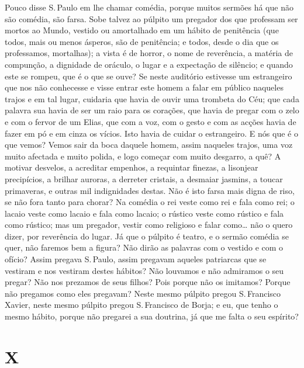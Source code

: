 Pouco disse S.\,Paulo em lhe chamar comédia, porque muitos sermões há
que não são comédia, são farsa. Sobe talvez ao púlpito um pregador dos
que professam ser mortos ao Mundo, vestido ou amortalhado em um hábito
de penitência (que todos, mais ou menos ásperos, são de penitência; e
todos, desde o dia que os professamos, mortalhas); a vista é de horror,
o nome de reverência, a matéria de compunção, a dignidade de oráculo, o
lugar e a expectação de silêncio; e quando este se rompeu, que é o que
se ouve? Se neste auditório estivesse um estrangeiro que nos não
conhecesse e visse entrar este homem a falar em público naqueles trajos
e em tal lugar, cuidaria que havia de ouvir uma trombeta do Céu; que
cada palavra sua havia de ser um raio para os corações, que havia de
pregar com o zelo e com o fervor de um Elias, que com a voz, com o gesto
e com as acções havia de fazer em pó e em cinza os vícios. Isto havia de
cuidar o estrangeiro. E nós que é o que vemos? Vemos sair da boca
daquele homem, assim naqueles trajos, uma voz muito afectada e muito
polida, e logo começar com muito desgarro, a quê? A motivar desvelos,
a acreditar empenhos, a requintar finezas, a lisonjear precipícios, a
brilhar auroras, a derreter cristais, a desmaiar jasmins, a toucar
primaveras, e outras mil indignidades destas. Não é isto farsa mais
digna de riso, se não fora tanto para chorar? Na comédia o rei veste
como rei e fala como rei; o lacaio veste como lacaio e fala como lacaio;
o rústico veste como rústico e fala como rústico; mas um pregador,
vestir como religioso e falar como\ldots{} não o quero dizer, por
reverência do lugar. Já que o púlpito é teatro, e o sermão comédia se
quer, não faremos bem a figura? Não dirão as palavras com o vestido e
com o ofício? Assim pregava S.\,Paulo, assim pregavam aqueles
patriarcas que se vestiram e nos vestiram destes hábitos? Não louvamos e
não admiramos o seu pregar? Não nos prezamos de seus filhos? Pois porque
não os imitamos? Porque não pregamos como eles pregavam? Neste mesmo
púlpito pregou S.\,Francisco Xavier, neste mesmo púlpito pregou S.\,Francisco de
Borja; e eu, que tenho o mesmo hábito, porque não pregarei a sua
doutrina, já que me falta o seu espírito?

\section{X}

